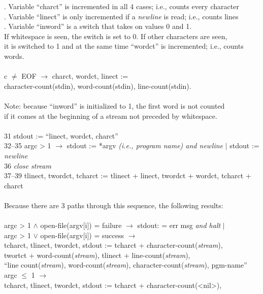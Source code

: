 \begin{tabbing}
	. Variable ``charct'' is incremented in all 4 cases; i.e., counts every character\\
	. Variable ``linect'' is only incremented if a {\em newline} is read; i.e., counts lines\\
	. Variable ``inword'' is a switch that takes on values 0 and 1.\\
	\> If whitespace is seen, the switch is set to 0. If other characters are seen,\\
	\> it is switched to 1 and at the same time ``wordct'' is incremented; i.e., counts words.\\
\\
	\> c $\not=$ EOF $\rightarrow$ 	charct, wordct, linect :=	\\
	\> \> character-count(stdin), word-count(stdin), line-count(stdin).\\
\\
	\> Note: because ``inword'' is initialized to 1, the first word is not counted\\
	\> if it comes at the beginning of a stream not preceded by whitespace.\\
\\
31	\> stdout := ``linect, wordct, charct''\\
32--35	\> argc > 1 $\rightarrow$ stdout := *argv {\em (i.e., program name) and newline} $\mid$ stdout := {\em newline}\\
36	\> {\em close stream}\\
37--39	\> tlinect, twordct, tcharct := tlinect + linect, twordct + wordct, tcharct + charct\\
\\
	\> Because there are 3 paths through this sequence, the following results:\\
\\
	\> argc > 1 $\wedge$ open-file(argv[i]) = failure $\rightarrow$ stdout: = err msg {\em and halt} $\mid$\\
	\> argc > 1 $\vee$   open-file(argv[i]) = success $\rightarrow$\\
	\> \>	tcharct, tlinect, twordct, stdout := tcharct + character-count({\em stream}),\\
	\> \>	twortct + word-count({\em stream}), tlinect + line-count({\em stream}),\\
	\> \>   ``line count({\em stream}), word-count({\em stream}), character-count({\em stream}), pgm-name''\\
	\> argc $\leq$ 1 $\rightarrow$\\
	\> \>	tcharct, tlinect, twordct, stdout := tcharct + character-count(<nil>),\\

\end{tabbing}
